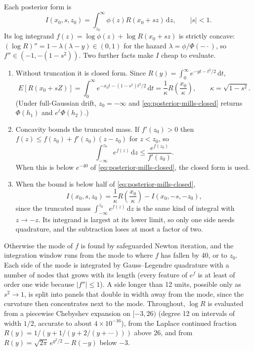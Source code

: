 \documentclass[12pt]{article}
\newcommand{\dd}{\,\mathrm{d}}
\newcommand{\PhiN}{\Phi}
\newcommand{\phiN}{\phi}
\begin{document}
Each posterior form is
\[
 I(x_0,s,z_0)=\int_{z_0}^\infty\phiN(z)R(x_0+sz)\dd z,\qquad |s|<1.
\]
Its log integrand $f(z)=\log\phiN(z)+\log R(x_0+sz)$ is strictly concave: $(\log R)''=1-\lambda(\lambda-y)\in(0,1)$ for the hazard $\lambda=\phiN/\PhiN(-\cdot)$, so $f''\in(-1,-(1-s^2))$. Two further facts make $I$ cheap to evaluate.
\begin{enumerate}
 \item Without truncation it is closed form. Since $R(y)=\int_0^\infty e^{-yt-t^2/2}\dd t$,
 \begin{equation}
  E\left[R(x_0+sZ)\right]=\int_0^\infty e^{-x_0t-(1-s^2)t^2/2}\dd t
  =\frac{1}{\kappa}R\!\left(\frac{x_0}{\kappa}\right),\qquad
  \kappa=\sqrt{1-s^2}.
  \label{eq:posterior-mills-closed}
 \end{equation}
 (Under full-Gaussian drift, $z_0=-\infty$ and \eqref{eq:posterior-mills-closed} returns $\PhiN(h_1)$ and $e^\ell\PhiN(h_2)$.)
 \item Concavity bounds the truncated mass. If $f'(z_0)>0$ then $f(z)\le f(z_0)+f'(z_0)(z-z_0)$ for $z<z_0$, so
 \[
  \int_{-\infty}^{z_0}e^{f(z)}\dd z\le\frac{e^{f(z_0)}}{f'(z_0)}.
 \]
 When this is below $e^{-40}$ of \eqref{eq:posterior-mills-closed}, the closed form is used.
 \item When the bound is below half of \eqref{eq:posterior-mills-closed},
 \[
  I(x_0,s,z_0)=\frac{1}{\kappa}R\!\left(\frac{x_0}{\kappa}\right)-I(x_0,-s,-z_0),
 \]
 since the truncated mass $\int_{-\infty}^{z_0}e^{f(z)}\dd z$ is the same kind of integral with $z\to-z$. Its integrand is largest at its lower limit, so only one side needs quadrature, and the subtraction loses at most a factor of two.
\end{enumerate}
Otherwise the mode of $f$ is found by safeguarded Newton iteration, and the integration window runs from the mode to where $f$ has fallen by 40, or to $z_0$. Each side of the mode is integrated by Gauss--Legendre quadrature with a number of nodes that grows with its length (every feature of $e^f$ is at least of order one wide because $|f''|\le1$). A side longer than 12 units, possible only as $s^2\to1$, is split into panels that double in width away from the mode, since the curvature then concentrates next to the mode. Throughout, $\log R$ is evaluated from a piecewise Chebyshev expansion on $[-3,26)$ (degree 12 on intervals of width $1/2$, accurate to about $4\times10^{-16}$), from the Laplace continued fraction $R(y)=1/(y+1/(y+2/(y+\cdots)))$ above 26, and from $R(y)=\sqrt{2\pi}\,e^{y^2/2}-R(-y)$ below $-3$.
\end{document}
